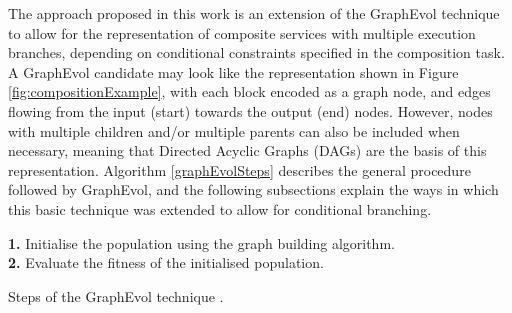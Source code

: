 The approach proposed in this work is an extension of the GraphEvol technique \cite{sawczuk2015graphevol} to allow for the representation of composite services with multiple execution branches, depending on conditional constraints specified in the composition task. A GraphEvol candidate may look like the representation shown in Figure \ref{fig:compositionExample}, with each block encoded as a graph node, and edges flowing from the input (start) towards the output (end) nodes. However, nodes with multiple children and/or multiple parents can also be included when necessary, meaning that Directed Acyclic Graphs (DAGs) are the basis of this representation. Algorithm \ref{graphEvolSteps} describes the general procedure followed by GraphEvol, and the following subsections explain the ways in which this basic technique was extended to allow for conditional branching.

\begin{algorithm}
 \setlength{}
 \let\oldnl\nl%
\newcommand{\nonl}{\renewcommand{\nl}{\let\nl\oldnl}}
 \LinesNumbered
	\textbf{1.} Initialise the population using the graph building algorithm.\\
	\textbf{2.} Evaluate the fitness of the initialised population.\\
	\nonl {}
 \caption{\footnotesize Steps of the GraphEvol technique \protect\cite{sawczuk2015graphevol}.}
\label{graphEvolSteps}
\end{algorithm}

